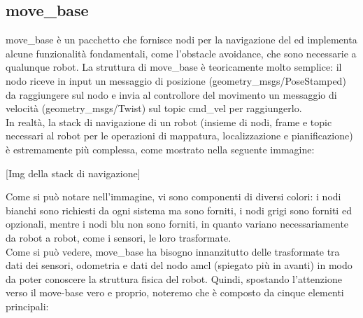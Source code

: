 \documentclass[Lau]{sapthesis}
\begin{document}
\subsection{move\_base}
move\_base è un pacchetto che fornisce nodi per la navigazione del ed implementa alcune funzionalità fondamentali, come l'obstacle avoidance, che sono necessarie a qualunque robot. La struttura di move\_base è teoricamente molto semplice: il nodo riceve in input un messaggio di posizione (geometry\_msgs/PoseStamped) da raggiungere sul nodo e invia al controllore del movimento un messaggio di velocità (geometry\_msgs/Twist) sul topic cmd\_vel per raggiungerlo.\\ In realtà, la stack di navigazione di un robot (insieme di nodi, frame e topic necessari al robot per le operazioni di mappatura, localizzazione e pianificazione) è estremamente più complessa, come mostrato nella seguente immagine:
\begin{center}
[Img della stack di navigazione]
\end{center}
Come si può notare nell'immagine, vi sono componenti di diversi colori: i nodi bianchi sono richiesti da ogni sistema ma sono forniti, i nodi grigi sono forniti ed opzionali, mentre i nodi blu non sono forniti, in quanto variano necessariamente da robot a robot, come i sensori, le loro trasformate.\\ Come si può vedere, move\_base ha bisogno innanzitutto delle trasformate tra dati dei sensori, odometria e dati del nodo amcl (spiegato più in avanti) in modo da poter conoscere la struttura fisica del robot. Quindi, spostando l'attenzione verso il move-base vero e proprio, noteremo che è composto da cinque elementi principali: 
\end{document}
